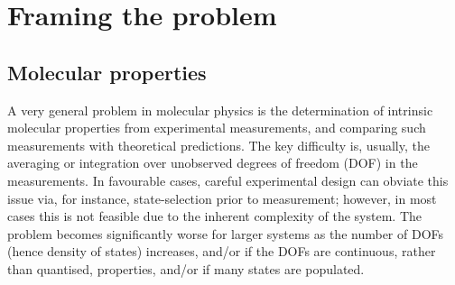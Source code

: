 \section{Framing the problem}

\subsection{Molecular properties}
A very general problem in molecular physics is the determination of intrinsic molecular properties from experimental measurements, and comparing such measurements with theoretical predictions. The key difficulty is, usually, the averaging or integration over unobserved degrees of freedom (DOF) in the measurements. In favourable cases, careful experimental design can obviate this issue via, for instance, state-selection prior to measurement; however, in most cases this is not feasible due to the inherent complexity of the system. The problem becomes significantly worse for larger systems as the number of DOFs (hence density of states) increases, and/or if the DOFs are continuous, rather than quantised, properties, and/or if many states are populated.